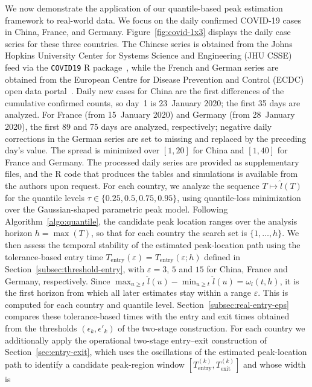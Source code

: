 \documentclass[12pt,a4paper]{article}
\begin{document}
We now demonstrate the application of our quantile-based peak estimation
framework to real-world data. We focus on the daily confirmed COVID-19
cases in China, France, and Germany. Figure~\ref{fig:covid-1x3} displays
the daily case series for these three countries. 
The Chinese series is obtained from the Johns Hopkins University Center for Systems Science and Engineering (JHU CSSE) feed via the \texttt{COVID19} R package~\citep{Guidotti2020,Guidotti2022}, while the French and German series are obtained from the European Centre for Disease Prevention and Control (ECDC) open data portal~.
Daily new cases for China are the first differences of the cumulative confirmed
counts, so day~1 is 23~January 2020; the first 35 days are analyzed. For France
(from 15~January 2020) and Germany (from 28~January 2020), the first 89 and 75
days are analyzed, respectively; negative daily corrections in the German series
are set to missing and replaced by the preceding day's value. The spread is minimized over $[1,20]$ for China and $[1,40]$ for France and Germany. The processed daily series are provided as supplementary files, and the R code that produces the tables and simulations is
available from the authors upon request.
For each country, we analyze the sequence $T \mapsto \hat{l}(T)$ for the quantile levels
$\tau \in \{0.25,0.5,0.75,0.95\}$, using quantile-loss minimization over
the Gaussian-shaped parametric peak model. Following Algorithm~\ref{algo:quantile}, the candidate peak location ranges over the analysis horizon
$h = \max(T)$, so that for each country the search set is
$\{1,\ldots,h\}$.
We then assess the temporal stability of the estimated peak-location path using the tolerance-based entry time $T_{\mathrm{entry}}(\varepsilon)=T_{\mathrm{entry}}(\varepsilon;h)$ defined in Section~\ref{subsec:threshold-entry}, with $\varepsilon=3$, $5$ and $15$ for China, France and Germany, respectively. Since
$\max_{u\ge t}\hat l(u)-\min_{u\ge t}\hat l(u)=\omega_l(t,h)$, it is the first
horizon from which all later estimates stay within a range $\varepsilon$.
This is computed for each country and quantile level.
Section~\ref{subsec:real-entry-eps} compares these tolerance-based times
with the entry and exit times obtained from the thresholds
$(\epsilon_k,\epsilon'_k)$ of the two-stage construction.
For each country we
additionally apply the operational two-stage entry--exit construction of
Section~\ref{sec:entry-exit}, which uses the oscillations of the
estimated peak-location path to identify a candidate peak-region window
$[T_{\mathrm{entry}}^{(k)},T_{\mathrm{exit}}^{(k)}]$ and whose width is
\end{document}
